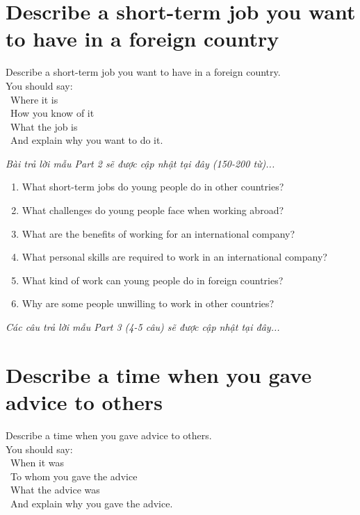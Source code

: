 \section{Describe a short-term job you want to have in a foreign country}
\begin{ieltsprompt}
Describe a short-term job you want to have in a foreign country. \\
You should say: \\
\textbullet\ Where it is \\
\textbullet\ How you know of it \\
\textbullet\ What the job is \\
\textbullet\ And explain why you want to do it. \\
\end{ieltsprompt}

\vspace{1em}
\textit{Bài trả lời mẫu Part 2 sẽ được cập nhật tại đây (150-200 từ)...}
\vspace{2em}

\begin{ieltsprompt}
\begin{enumerate}[itemsep=4pt]
    \item What short-term jobs do young people do in other countries?
    \item What challenges do young people face when working abroad?
    \item What are the benefits of working for an international company?
    \item What personal skills are required to work in an international company?
    \item What kind of work can young people do in foreign countries?
    \item Why are some people unwilling to work in other countries?
\end{enumerate}
\end{ieltsprompt}

\vspace{1em}
\textit{Các câu trả lời mẫu Part 3 (4-5 câu) sẽ được cập nhật tại đây...}
\vspace{2em}

\section{Describe a time when you gave advice to others}
\begin{ieltsprompt}
Describe a time when you gave advice to others. \\
You should say: \\
\textbullet\ When it was \\
\textbullet\ To whom you gave the advice \\
\textbullet\ What the advice was \\
\textbullet\ And explain why you gave the advice. \\
\end{ieltsprompt}

